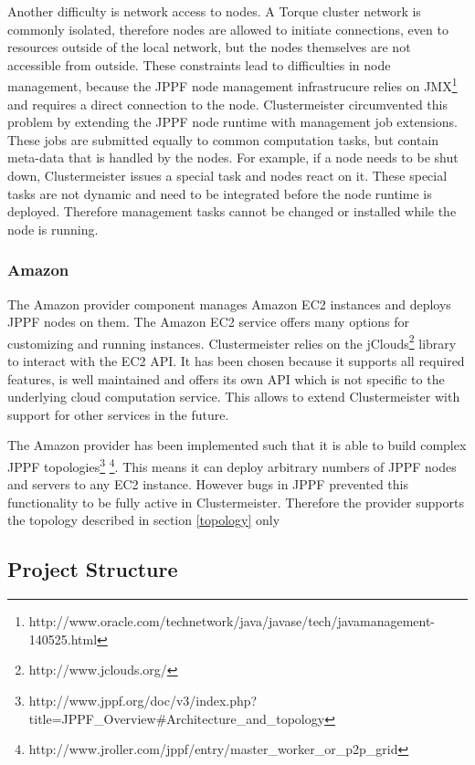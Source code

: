 \documentclass[12pt]{article}
\begin{document}
Another difficulty is network access to nodes. A Torque cluster network is commonly isolated, therefore nodes are allowed to initiate connections, even to resources outside of the local network, but the nodes themselves are not accessible from outside. These constraints lead to difficulties in node management, because the JPPF node management infrastrucure relies on JMX\footnote{http://www.oracle.com/technetwork/java/javase/tech/javamanagement-140525.html} and requires a direct connection to the node. Clustermeister circumvented this problem by extending the JPPF node runtime with management job extensions. These jobs are submitted equally to common computation tasks, but contain meta-data that is handled by the nodes. For example, if a node needs to be shut down, Clustermeister issues a special task and nodes react on it. These special tasks are not dynamic and need to be integrated before the node runtime is deployed. Therefore management tasks cannot be changed or installed while the node is running.

\subsubsection{Amazon}
The Amazon provider component manages Amazon EC2 instances and deploys JPPF nodes on them. The Amazon EC2 service offers many options for customizing and running instances. Clustermeister relies on the jClouds\footnote{http://www.jclouds.org/} library to interact with the EC2 API. It has been chosen because it supports all required features, is well maintained and offers its own API which is not specific to the underlying cloud computation service. This allows to extend Clustermeister with support for other services in the future.

The Amazon provider has been implemented such that it is able to build complex JPPF topologies\footnote{http://www.jppf.org/doc/v3/index.php?title=JPPF\_Overview\#Architecture\_and\_topology} \footnote{http://www.jroller.com/jppf/entry/master\_worker\_or\_p2p\_grid}. This means it can deploy arbitrary numbers of JPPF nodes and servers to any EC2 instance. However bugs in JPPF prevented this functionality to be fully active in Clustermeister. Therefore the provider supports the topology described in section \ref{topology} only

\subsection{Project Structure}
\label{structure}
\end{document}

